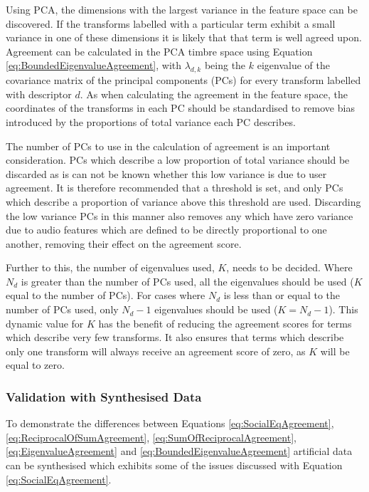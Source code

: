 			Using PCA, the dimensions with the largest variance in the feature space can be discovered. If the
			transforms labelled with a particular term exhibit a small variance in one of these dimensions it
			is likely that that term is well agreed upon. Agreement can be calculated in the PCA timbre space
			using Equation \ref{eq:BoundedEigenvalueAgreement}, with $\lambda_{d,k}$ being the $k$
			eigenvalue of the covariance matrix of the principal components (PCs) for every transform labelled
			with descriptor $d$. As when calculating the agreement in the feature space, the coordinates of the
			transforms in each PC should be standardised to remove bias introduced by the proportions of total
			variance each PC describes.

			The number of PCs to use in the calculation of agreement is an important consideration. PCs which
			describe a low proportion of total variance should be discarded as is can not be known whether this
			low variance is due to user agreement. It is therefore recommended that a threshold is set, and
			only PCs which describe a proportion of variance above this threshold are used. Discarding the low
			variance PCs in this manner also removes any which have zero variance due to audio features
			which are defined to be directly proportional to one another, removing their effect on the
			agreement score.

			Further to this, the number of eigenvalues used, $K$, needs to be decided. Where $N_{d}$ is greater
			than the number of PCs used, all the eigenvalues should be used ($K$ equal to the number of PCs).
			For cases where $N_{d}$ is less than or equal to the number of PCs used, only $N_{d} - 1$
			eigenvalues should be used ($K = N_{d} - 1$). This dynamic value for $K$ has the benefit of
			reducing the agreement scores for terms which describe very few transforms. It also ensures that
			terms which describe only one transform will always receive an agreement score of zero, as $K$ will
			be equal to zero.

		\subsubsection*{Validation with Synthesised Data}
			To demonstrate the differences between Equations \ref{eq:SocialEqAgreement},
			\ref{eq:ReciprocalOfSumAgreement}, \ref{eq:SumOfReciprocalAgreement}, \ref{eq:EigenvalueAgreement}
			and \ref{eq:BoundedEigenvalueAgreement} artificial data can be synthesised which exhibits some of
			the issues discussed with Equation \ref{eq:SocialEqAgreement}.
			
